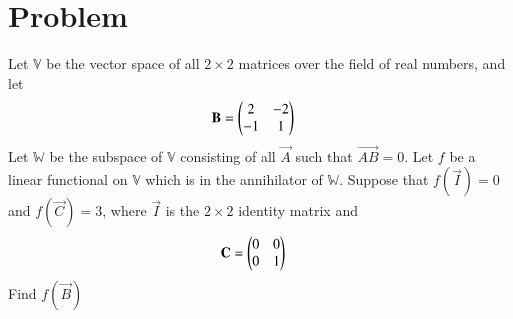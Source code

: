 \documentclass[journal,12pt,twocolumn]{IEEEtran}
\begin{document}
\section{\textbf{Problem}}
Let $\mathbb{V}$ be the vector space of all $2 \times 2$ matrices over the field of real numbers, and let
\begin{align*}
\mathbf{B} &= \begin{pmatrix}2&-2\\-1&1\end{pmatrix}
\end{align*}
Let $\mathbb{W}$ be the subspace of $\mathbb{V}$ consisting of all $\vec{A}$ such that $\vec{AB} = 0$. Let $f$ be a linear functional on $\mathbb{V}$ which is in the annihilator of $\mathbb{W}$. Suppose that $f(\vec{I}) = 0$ and $f(\vec{C}) = 3$, where $\vec{I}$ is the $2 \times 2$ identity matrix and
\begin{align*}
\mathbf{C} &= \begin{pmatrix}0&0\\0&1\end{pmatrix}
\end{align*}
Find $f(\vec{B})$
\end{document}
